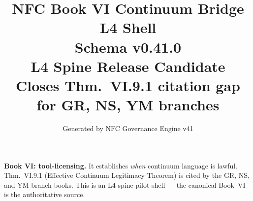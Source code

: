 \documentclass[11pt]{article}
\title{NFC Book VI Continuum Bridge L4 Shell\\[1ex]\large Schema v0.41.0\\[0.5ex]
\normalsize L4 Spine Release Candidate\\[0.5ex]
\small Closes Thm.~VI.9.1 citation gap for GR, NS, YM branches}
\author{Generated by NFC Governance Engine v41}
\date{}
\begin{document}
\maketitle
\tableofcontents
\bigskip
\noindent\textbf{Book VI: tool-licensing.} It establishes \emph{when} continuum
language is lawful. Thm.~VI.9.1 (Effective Continuum Legitimacy Theorem) is cited
by the GR, NS, and YM branch books. This is an L4 spine-pilot shell ---
the canonical Book~VI is the authoritative source.
\vspace{1em}

\end{document}
